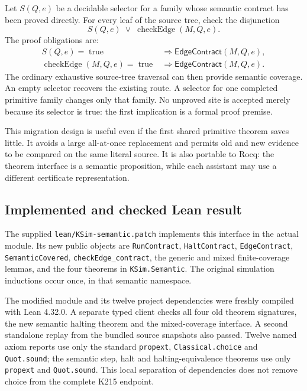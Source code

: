 \documentclass[11pt]{article}
\newcommand{\code}[1]{\texttt{\small #1}}
\begin{document}
Let $S(Q,e)$ be a decidable selector for a family whose semantic contract has been proved directly. For every leaf of the source tree, check the disjunction
\[
 S(Q,e)\;\lor\;\operatorname{checkEdge}(M,Q,e).
\]
The proof obligations are:
\begin{align*}
 S(Q,e)=\operatorname{true}&\Longrightarrow\mathsf{EdgeContract}(M,Q,e),\\
 \operatorname{checkEdge}(M,Q,e)=\operatorname{true}
 &\Longrightarrow\mathsf{EdgeContract}(M,Q,e).
\end{align*}
The ordinary exhaustive source-tree traversal can then provide semantic coverage. An empty selector recovers the existing route. A selector for one completed primitive family changes only that family. No unproved site is accepted merely because its selector is true: the first implication is a formal proof premise.

This migration design is useful even if the first shared primitive theorem saves little. It avoids a large all-at-once replacement and permits old and new evidence to be compared on the same literal source. It is also portable to Rocq: the theorem interface is a semantic proposition, while each assistant may use a different certificate representation.

\subsection{Implemented and checked Lean result}

The supplied \code{lean/KSim-semantic.patch} implements this interface in the actual module. Its new public objects are \code{RunContract}, \code{HaltContract}, \code{EdgeContract}, \code{SemanticCovered}, \code{checkEdge\_contract}, the generic and mixed finite-coverage lemmas, and the four theorems in \code{KSim.Semantic}. The original simulation inductions occur once, in that semantic namespace.

The modified module and its twelve project dependencies were freshly compiled with Lean 4.32.0. A separate typed client checks all four old theorem signatures, the new semantic halting theorem and the mixed-coverage interface. A second standalone replay from the bundled source snapshots also passed. Twelve named axiom reports use only the standard \code{propext}, \code{Classical.choice} and \code{Quot.sound}; the semantic step, halt and halting-equivalence theorems use only \code{propext} and \code{Quot.sound}. This local separation of dependencies does not remove choice from the complete K215 endpoint.
\end{document}
